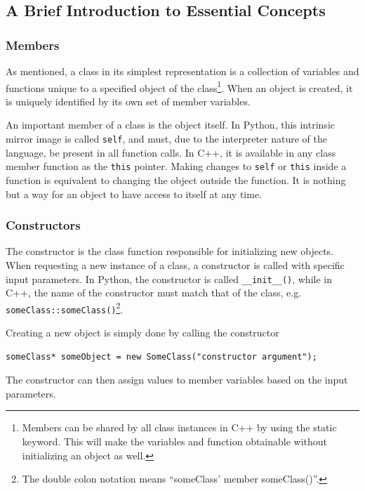 \subsection{A Brief Introduction to Essential Concepts}

\subsubsection{Members}

As mentioned, a class in its simplest representation is a collection of variables and functions unique to a specified object of the class\footnote{Members can be shared by all class instances in C++ by using the static keyword. This will make the variables and function obtainable without initializing an object as well.}. When an object is created, it is uniquely identified by its own set of member variables.

An important member of a class is the object itself. In Python, this intrinsic mirror image is called \verb+self+, and must, due to the interpreter nature of the language, be present in all function calls. In C++, it is available in any class member function as the \verb+this+ pointer. Making changes to \verb+self+ or \verb+this+ inside a function is equivalent to changing the object outside the function. It is nothing but a way for an object to have access to itself at any time.

\subsubsection{Constructors}

The constructor is the class function responsible for initializing new objects. When requesting a new instance of a class, a constructor is called with specific input parameters. In Python, the constructor is called \verb+__init__()+, while in C++, the name of the constructor must match that of the class, e.g. \verb+someClass::someClass()+\footnote{The double colon notation means ``someClass' member someClass()''.}.

Creating a new object is simply done by calling the constructor

\begin{lstlisting}
someClass* someObject = new SomeClass("constructor argument");
\end{lstlisting}

The constructor can then assign values to member variables based on the input parameters.

